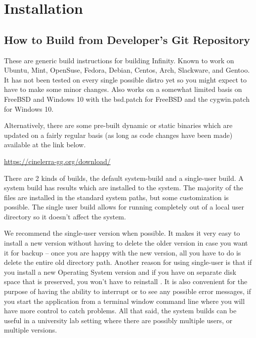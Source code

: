 \chapter{Installation}
\label{cha:Installation}
\section{How to Build \CGG{} from Developer's Git Repository}%
\label{sec:How_to_build}

These are generic build instructions for building \CGG{} Infinity.  
Known to work on Ubuntu, Mint, OpenSuse, Fedora, Debian, Centos, Arch, Slackware, and Gentoo. 
It has not been tested on every single possible distro yet so you might expect to have to make some minor changes.
Also works on a somewhat limited basis on FreeBSD and Windows 10 with the bsd.patch for FreeBSD
and the cygwin.patch for Windows 10.

Alternatively, there are some pre-built dynamic or static binaries which are updated on a fairly regular basis (as long as code changes have been made) available at the link below.

\begin{center}
	{\small \url{https://cinelerra-gg.org/download/}}
\end{center}

There are 2 kinds of builds, the default system-build and a single-user build.  
A system build has results which are installed to the system. 
The majority of the files are installed in the standard system paths, but some customization is possible. 
The single user build allows for running completely out of a local user directory so it doesn't affect the system.

We recommend the single-user version when possible.  
It makes it very easy to install a new version without having to delete the older version in case you want it for backup -- once you are happy with the new version, all you have to do is delete the entire old directory path.  
Another reason for using single-user is that if you install a new Operating System version and if you have \CGG{} on separate disk space that is preserved, you won't have to reinstall \CGG{}.  
It is also convenient for the purpose of having the ability to interrupt or to see any possible error messages, if you start the application from a terminal window command line where you will have more control to catch problems.  
All that said, the system builds can be useful in a university lab setting where there are possibly multiple users, or multiple versions.

